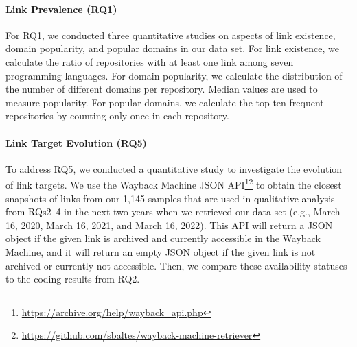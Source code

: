 \documentclass[smallextended]{svjour3}       %
\newcommand{\fix}[1]{\textcolor{black}{#1}}
\begin{document}
\paragraph{Link Prevalence (RQ1)} For RQ1, we conducted three quantitative studies on aspects of link existence, domain popularity, and popular domains in our data set. For link existence, we calculate the ratio of repositories with at least one link among seven programming languages. For domain popularity, we calculate the distribution of the number of different domains per repository. Median values are used to measure popularity. For popular domains, we calculate the top ten frequent repositories by counting only once in each repository.

\paragraph{Link Target Evolution (RQ5)} To address RQ5, we conducted a quantitative study to investigate the evolution of link targets. We use the Wayback Machine JSON API\footnote{\url{https://archive.org/help/wayback_api.php}}\footnote{\url{https://github.com/sbaltes/wayback-machine-retriever}} to obtain the closest snapshots of links from our 1,145 samples that are used in \fix{qualitative analysis from RQs2--4} in the next two years when we retrieved our data set (e.g., March 16, 2020, March 16, 2021, and March 16, 2022). 
This API will return a JSON object if the given link is archived and currently accessible in the Wayback Machine, and it will return an empty JSON object if the given link is not archived or currently not accessible. Then, we compare these availability statuses to the coding results from RQ2.
\end{document}
